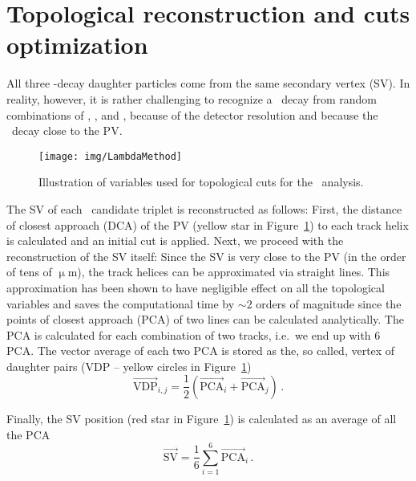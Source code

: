 \section{Topological reconstruction and cuts optimization}

All three \Lambdac-decay daughter particles come from the same secondary vertex (SV)\@. In reality, however, it is rather challenging to recognize a \Lambdac\ decay from random combinations of \pipm, \Kmp, and \ppm, because of the detector resolution and because the \Lambdac\ decay close to the PV\@.

\begin{figure}[!htb]
\centering
\texttt{[image: img/LambdaMethod]}
\caption{\label{fig:method}Illustration of variables used for topological cuts for the \Lambdac\ analysis.}
\end{figure}

The SV of each \Lambdac\ candidate triplet is reconstructed as follows: First, the distance of closest approach (DCA) of the PV (yellow star in Figure~\ref{fig:method}) to each track helix is calculated and an initial cut is applied. Next, we proceed with the reconstruction of the SV itself\@: Since the SV is very close to the PV (in the order of tens of $\upmu$m), the track helices can be approximated via straight lines. This approximation has been shown to have negligible effect on all the topological variables and saves the computational time by $\sim$2 orders of magnitude since the points of closest approach (PCA) of two lines can be calculated analytically. The PCA is calculated for each combination of two tracks, i.e.\ we end up with 6 PCA\@. The vector average of each two PCA is stored as the, so called, vertex of daughter pairs (VDP -- yellow circles in Figure~\ref{fig:method})
\begin{equation}
\overrightarrow{\mathrm{VDP}}_{i,j} = \frac{1}{2} \left( \overrightarrow{\mathrm{PCA}}_i + \overrightarrow{\mathrm{PCA}}_j \right)\,. 
\end{equation}
 
Finally, the SV position (red star in Figure~\ref{fig:method}) is calculated as an average of all the PCA
\begin{equation}
\overrightarrow{\mathrm{SV}}=\frac{1}{6}\sum_{i=1}^6 \overrightarrow{\mathrm{PCA}}_i \,.
\end{equation}



